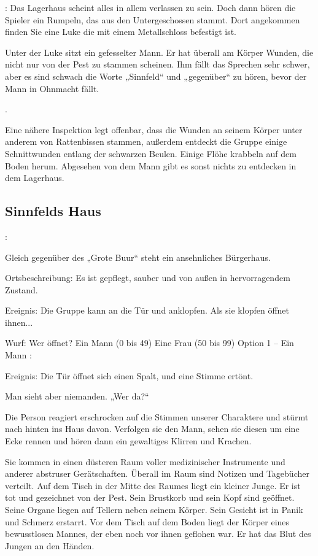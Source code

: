 : Das Lagerhaus scheint alles in allem verlassen zu sein. Doch dann hören die Spieler ein Rumpeln, das aus den Untergeschossen stammt. Dort angekommen finden Sie eine Luke die mit einem Metallschloss befestigt ist.


Unter der Luke sitzt ein gefesselter Mann. Er hat überall am Körper Wunden, die nicht nur von der Pest zu stammen scheinen. Ihm fällt das Sprechen sehr schwer, aber es sind schwach die Worte „Sinnfeld“ und „gegenüber“ zu hören, bevor der Mann in Ohnmacht fällt.

.

Eine nähere Inspektion legt offenbar, dass die Wunden an seinem Körper unter anderem von Rattenbissen stammen, außerdem entdeckt die Gruppe einige Schnittwunden entlang der schwarzen Beulen. Einige Flöhe krabbeln auf dem Boden herum. Abgesehen von dem Mann gibt es sonst nichts zu entdecken in dem Lagerhaus.

\subsection{Sinnfelds Haus}
:

Gleich gegenüber des „Grote Buur“ steht ein ansehnliches Bürgerhaus.

Ortsbeschreibung: Es ist gepflegt, sauber und von außen in hervorragendem Zustand.

Ereignis: Die Gruppe kann an die Tür und anklopfen. Als sie klopfen öffnet ihnen...

Wurf: Wer öffnet?
Ein Mann (0 bis 49)
Eine Frau (50 bis 99)
Option 1 – Ein Mann
:

Ereignis: Die Tür öffnet sich einen Spalt, und eine Stimme ertönt.

Man sieht aber niemanden. „Wer da?“

Die Person reagiert erschrocken auf die Stimmen unserer Charaktere und stürmt nach hinten ins Haus davon. Verfolgen sie den Mann, sehen sie diesen um eine Ecke rennen und hören dann ein gewaltiges Klirren und Krachen.

Sie kommen in einen düsteren Raum voller medizinischer Instrumente und anderer abstruser Gerätschaften. Überall im Raum sind Notizen und Tagebücher verteilt. Auf dem Tisch in der Mitte des Raumes liegt ein kleiner Junge. Er ist tot und gezeichnet von der Pest. Sein Brustkorb und sein Kopf sind geöffnet. Seine Organe liegen auf Tellern neben seinem Körper. Sein Gesicht ist in Panik und Schmerz erstarrt. Vor dem Tisch auf dem Boden liegt der Körper eines bewusstlosen Mannes, der eben noch vor ihnen geflohen war. Er hat das Blut des Jungen an den Händen.

